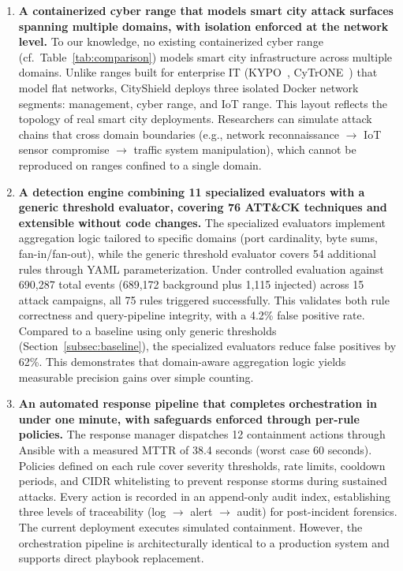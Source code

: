\documentclass[conference,10pt]{IEEEtran}
\begin{document}
\begin{enumerate}[leftmargin=*]
    \item \textbf{A containerized cyber range that models smart city attack surfaces spanning multiple domains, with isolation enforced at the network level.} To our knowledge, no existing containerized cyber range (cf.\ Table~\ref{tab:comparison}) models smart city infrastructure across multiple domains. Unlike ranges built for enterprise IT (KYPO~\cite{vykopal2017kypo}, CyTrONE~\cite{beuran2018cytrone}) that model flat networks, CityShield deploys three isolated Docker network segments: management, cyber range, and IoT range. This layout reflects the topology of real smart city deployments. Researchers can simulate attack chains that cross domain boundaries (e.g., network reconnaissance $\rightarrow$ IoT sensor compromise $\rightarrow$ traffic system manipulation), which cannot be reproduced on ranges confined to a single domain.

    \item \textbf{A detection engine combining 11 specialized evaluators with a generic threshold evaluator, covering 76 ATT\&CK techniques and extensible without code changes.} The specialized evaluators implement aggregation logic tailored to specific domains (port cardinality, byte sums, fan-in/fan-out), while the generic threshold evaluator covers 54 additional rules through YAML parameterization. Under controlled evaluation against 690,287 total events (689,172 background plus 1,115 injected) across 15 attack campaigns, all 75 rules triggered successfully. This validates both rule correctness and query-pipeline integrity, with a 4.2\% false positive rate. Compared to a baseline using only generic thresholds (Section~\ref{subsec:baseline}), the specialized evaluators reduce false positives by 62\%. This demonstrates that domain-aware aggregation logic yields measurable precision gains over simple counting.

    \item \textbf{An automated response pipeline that completes orchestration in under one minute, with safeguards enforced through per-rule policies.} The response manager dispatches 12 containment actions through Ansible with a measured MTTR of 38.4 seconds (worst case 60 seconds). Policies defined on each rule cover severity thresholds, rate limits, cooldown periods, and CIDR whitelisting to prevent response storms during sustained attacks. Every action is recorded in an append-only audit index, establishing three levels of traceability (log $\rightarrow$ alert $\rightarrow$ audit) for post-incident forensics. The current deployment executes simulated containment. However, the orchestration pipeline is architecturally identical to a production system and supports direct playbook replacement.


\end{enumerate}
\end{document}
